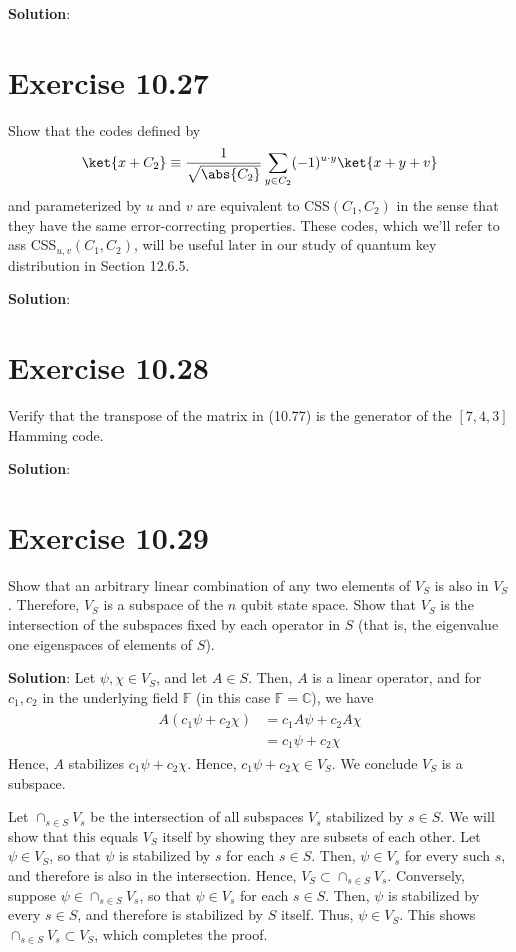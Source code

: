 \documentclass{book}
\begin{document}
    \textbf{Solution}:

\section*{Exercise 10.27}
    Show that the codes defined by
    \begin{align}
        \ket{x+C_2} \equiv \frac{1}{\sqrt{\abs{C_2}}} \sum_{y\in C_2} (-1)^{u\cdot y} \ket{x+y+v}
    \end{align}
    and parameterized by $u$ and $v$ are equivalent to CSS$(C_1, C_2)$ in the sense that they have the same error-correcting properties. These codes, which we'll refer to ass CSS$_{u,v}(C_1, C_2)$, will be useful later in our study of quantum key distribution in Section 12.6.5.

    \textbf{Solution}:

\section*{Exercise 10.28}
    Verify that the transpose of the matrix in (10.77) is the generator of the $[7,4,3]$ Hamming code. 

    \textbf{Solution}:
    
\section*{Exercise 10.29}
    Show that an arbitrary linear combination of any two elements of $V_S$ is also in $V_S$ . Therefore, $V_S$ is a subspace of the $n$ qubit state space. Show that $V_S$ is the intersection of the subspaces fixed by each operator in $S$ (that is, the eigenvalue one eigenspaces of elements of $S$).
    
    \textbf{Solution}: Let $\psi, \chi \in V_S$, and let $A \in S$. Then, $A$ is a linear operator, and for $c_1, c_2$ in the underlying field $\mathbb{F}$ (in this case $\mathbb{F}=\mathbb{C}$), we have
    \begin{align}
    \begin{aligned}
        A\left(c_1\psi + c_2\chi\right) &= c_1 A\psi + c_2 A\chi \\
        &=c_1\psi + c_2 \chi
    \end{aligned}
    \end{align}
    Hence, $A$ stabilizes $c_1\psi + c_2\chi$. Hence, $c_1\psi + c_2 \chi\in V_S$. We conclude $V_S$ is a subspace. 
    
    Let $\cap_{s\in S} V_s$ be the intersection of all subspaces $V_s$ stabilized by $s\in S$. We will show that this equals $V_S$ itself by showing they are subsets of each other. Let $\psi \in V_S$, so that $\psi$ is stabilized by $s$ for each $s\in S$. Then, $\psi\in V_s$ for every such $s$, and therefore is also in the intersection. Hence, $V_S \subset \cap_{s\in S} V_s$. Conversely, suppose $\psi \in \cap_{s\in S} V_s$, so that $\psi\in V_s$ for each $s\in S$. Then, $\psi$ is stabilized by every $s \in S$, and therefore is stabilized by $S$ itself. Thus, $\psi \in V_S$. This shows $\cap_{s\in S} V_s \subset V_S$, which completes the proof.
    
\end{document}
